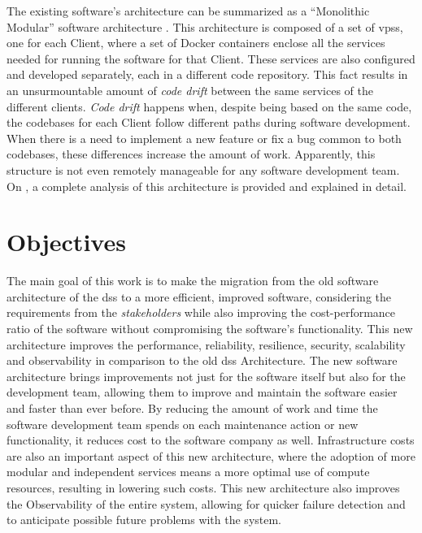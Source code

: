 

The existing software’s architecture can be summarized as a “Monolithic Modular” software architecture \parencite{newman2019monolith}. This architecture is composed of a set of \glspl{vps}, one for each Client, where a set of Docker containers enclose all the services needed for running the software for that Client. These services are also configured and developed separately, each in a different code repository. This fact results in an unsurmountable amount of \textit{code drift} between the same services of the different clients. \textit{Code drift} happens when, despite being based on the same code, the codebases for each Client follow different paths during software development. When there is a need to implement a new feature or fix a bug common to both codebases, these differences increase the amount of work. Apparently, this structure is not even remotely manageable for any software development team. On , a complete analysis of this architecture is provided and explained in detail.


\section{Objectives}\label{intro:s:objectives}

The main goal of this work is to make the migration from the old software architecture of the \gls{dss} to a more efficient, improved software, considering the requirements from the \textit{stakeholders} while also improving the cost-performance ratio of the software without compromising the software's functionality.
This new architecture improves the performance, reliability, resilience, security, scalability and observability in comparison to the old \gls{dss} Architecture. The new software architecture brings improvements not just for the software itself but also for the development team, allowing them to improve and maintain the software easier and faster than ever before. By reducing the amount of work and time the software development team spends on each maintenance action or new functionality, it reduces cost to the software company as well. Infrastructure costs are also an important aspect of this new architecture, where the adoption of more modular and independent services means a more optimal use of compute resources, resulting in lowering such costs. This new architecture also improves the Observability of the entire system, allowing for quicker failure detection and to anticipate possible future problems with the system.

